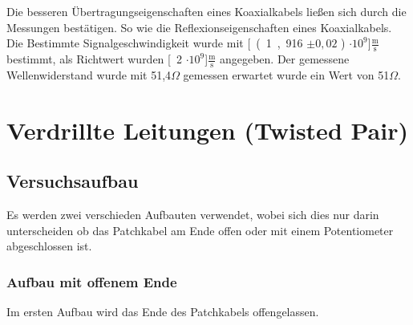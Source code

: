\documentclass[12pt,a4paper]{article}
\begin{document}
Die besseren Übertragungseigenschaften eines Koaxialkabels ließen sich durch die Messungen bestätigen. So wie die Reflexionseigenschaften eines Koaxialkabels. Die Bestimmte Signalgeschwindigkeit wurde mit \unit[(1,916 $\pm 0,02$ ) $\cdot 10^9$]{$\frac{\text{m}}{\text{s}}$} bestimmt, als Richtwert wurden \unit[2 $\cdot 10^9$]{$\frac{\text{m}}{\text{s}}$} angegeben. Der gemessene Wellenwiderstand wurde mit 51,4$\Omega$ gemessen erwartet wurde ein Wert von 51$\Omega$.




\section{Verdrillte Leitungen (Twisted Pair)}
\subsection{Versuchsaufbau}
Es werden zwei verschieden Aufbauten verwendet, wobei sich dies nur darin unterscheiden ob das Patchkabel am Ende offen oder mit einem Potentiometer abgeschlossen ist.

\subsubsection{Aufbau mit offenem Ende}

Im ersten Aufbau wird das Ende des Patchkabels offengelassen.
\end{document}
